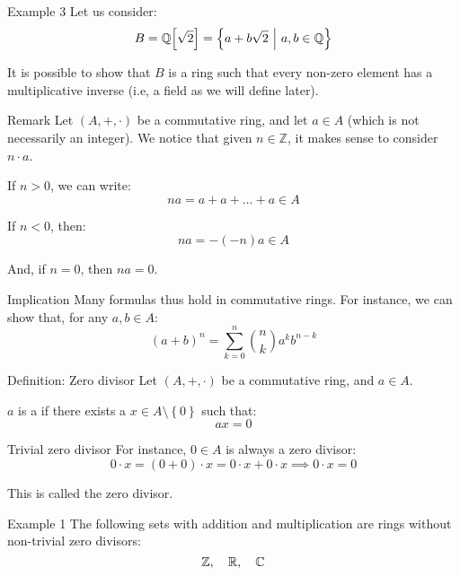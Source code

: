 \documentclass[a4paper]{article}
\begin{document}
\begin{parag}{Example 3}
    Let us consider: 
    \[B = \mathbb{Q}\left[\sqrt{2}\right] = \left\{a + b\sqrt{2} \suchthat a, b \in \mathbb{Q}\right\}\]
    
    It is possible to show that $B$ is a ring such that every non-zero element has a multiplicative inverse (i.e, a field as we will define later).
\end{parag}

\begin{parag}{Remark}
    Let $\left(A, +, \cdot \right)$ be a commutative ring, and let $a \in A$ (which is not necessarily an integer). We notice that given $n \in \mathbb{Z}$, it makes sense to consider $n\cdot a$.

    If $n > 0$, we can write: 
    \[na = a + a + \ldots + a \in A\]
    
    If $n < 0$, then: 
    \[na = -\left(-n\right)a \in A\]

    And, if $n = 0$, then $na = 0$.

    \begin{subparag}{Implication}
        Many formulas thus hold in commutative rings. For instance, we can show that, for any $a, b \in A$: 
        \[\left(a+ b\right)^n = \sum_{k=0}^{n} \binom{n}{k} a^k b^{n-k}\]
    \end{subparag}
\end{parag}

\begin{parag}{Definition: Zero divisor}
    Let $\left(A, +, \cdot \right)$ be a commutative ring, and $a \in A$.

    $a$ is a  if there exists a $x \in A \setminus \left\{0\right\}$ such that: 
    \[ax = 0\]
    
    \begin{subparag}{Trivial zero divisor}
        For instance, $0 \in A$ is always a zero divisor: 
        \[0\cdot x = \left(0 + 0\right)\cdot x = 0\cdot x + 0\cdot x \implies 0\cdot x = 0\]

        This is called the  zero divisor.
    \end{subparag}
\end{parag}

\begin{parag}{Example 1}
    The following sets with addition and multiplication are rings without non-trivial zero divisors: 
    \[\mathbb{Z}, \quad \mathbb{R}, \quad \mathbb{C}\]
\end{parag}
\end{document}
